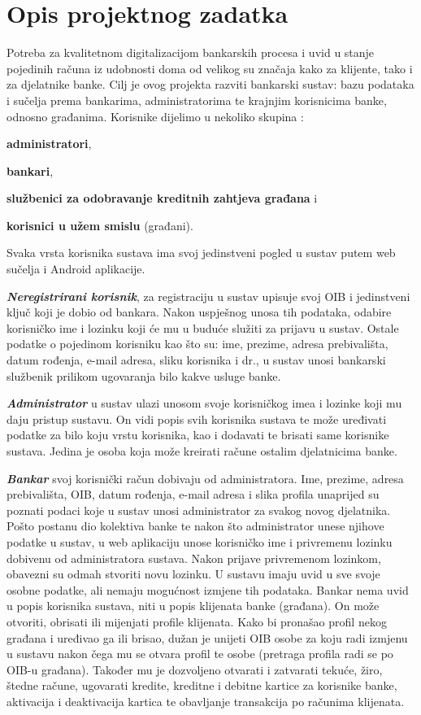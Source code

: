 \chapter{Opis projektnog zadatka}
		
		Potreba za kvalitetnom digitalizacijom bankarskih procesa i uvid u stanje pojedinih računa iz udobnosti doma od velikog su značaja kako za klijente, tako i za djelatnike banke. Cilj je ovog projekta razviti bankarski sustav: bazu podataka i sučelja prema bankarima, administratorima te krajnjim korisnicima banke, odnosno građanima.
		Korisnike dijelimo u nekoliko skupina : 
		\begin{packed_item}
			\item \textbf{administratori}, 
			\item \textbf{bankari},
			\item \textbf{službenici za odobravanje kreditnih zahtjeva građana} i 
			\item \textbf{korisnici u užem smislu} (građani).
		\end{packed_item}
		
		Svaka vrsta korisnika sustava ima svoj jedinstveni pogled u sustav putem web sučelja i Android aplikacije.
		
		\textit{\textbf{Neregistrirani korisnik}}, za registraciju u sustav upisuje svoj OIB i jedinstveni ključ koji je dobio od bankara. Nakon uspješnog unosa tih podataka, odabire korisničko ime i lozinku koji će mu u buduće služiti za prijavu u sustav. Ostale podatke o pojedinom korisniku kao što su: ime, prezime, adresa prebivališta, datum rođenja, e-mail adresa, sliku korisnika i dr., u sustav unosi bankarski službenik prilikom ugovaranja bilo kakve usluge banke.
		
		\textit{\textbf{Administrator}} u sustav ulazi unosom svoje korisničkog imea i lozinke koji mu daju pristup sustavu. On vidi popis svih korisnika sustava te može uređivati podatke za bilo koju vrstu korisnika, kao i dodavati te brisati same korisnike sustava. Jedina je osoba koja može kreirati račune ostalim djelatnicima banke.
		
		\textit{\textbf{Bankar}} svoj korisnički račun dobivaju od administratora. Ime, prezime, adresa prebivališta, OIB, datum rođenja, e-mail adresa i slika profila unaprijed su poznati podaci koje u sustav unosi administrator za svakog novog djelatnika. Pošto postanu dio kolektiva banke te nakon što administrator unese njihove podatke u sustav, u web aplikaciju unose korisničko ime i privremenu lozinku dobivenu od administratora sustava. Nakon prijave privremenom lozinkom, obavezni su odmah stvoriti novu lozinku. U sustavu imaju uvid u sve svoje osobne podatke, ali nemaju mogućnost izmjene tih podataka.
		Bankar nema uvid u popis korisnika sustava, niti u popis klijenata banke (građana). On može otvoriti, obrisati ili mijenjati profile klijenata. Kako bi pronašao profil nekog građana i uređivao ga ili brisao, dužan je unijeti OIB osobe za koju radi izmjenu u sustavu nakon čega mu se otvara profil te osobe (pretraga profila radi se po OIB-u građana). Također mu je dozvoljeno otvarati i zatvarati tekuće, žiro, štedne račune, ugovarati kredite, kreditne i debitne kartice za korisnike banke, aktivacija i deaktivacija kartica te obavljanje transakcija po računima klijenata.
		
